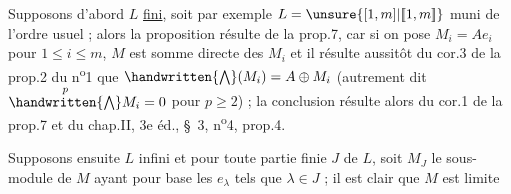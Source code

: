 Supposons d'abord $L$ \uline{fini}, soit par exemple $L=\unsure{[1,m]|[\![1,m]\!]}$ muni de l'ordre usuel ; alors la proposition résulte de la prop.7, car si on pose $M_i=Ae_i$ pour $1\leq i\leq m$, $M$ est somme directe des $M_i$ et il résulte aussitôt du cor.3 de la prop.2 du n\textsuperscript{o}1 que $\handwritten{\bigwedge}(M_i)=A\oplus M_i$ (autrement dit $\overset{p}{\handwritten{\bigwedge}}M_i=0$ pour $p\geq 2$) ; la conclusion résulte alors du cor.1 de la prop.7 et du chap.II, 3e éd., \S~3, n\textsuperscript{o}4, prop.4.

Supposons ensuite $L$ infini et pour toute partie finie $J$ de $L$, soit $M_J$ le sous-module de $M$ ayant pour base les $e_\lambda$ tels que $\lambda\in J$ ; il est clair que $M$ est limite

